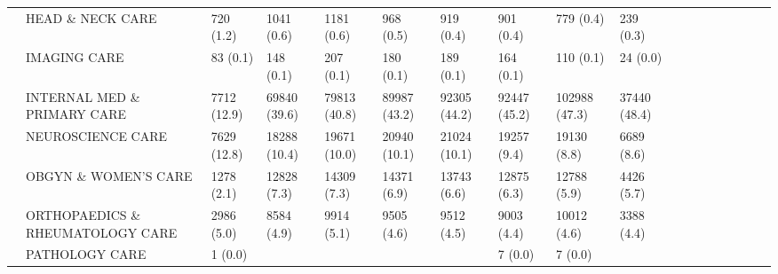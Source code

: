\begin{tabular}{llllllllllllllllll}
                                       & HEAD \& NECK CARE &                    720 (1.2) &      1041 (0.6) &      1181 (0.6) &       968 (0.5) &       919 (0.4) &       901 (0.4) &       779 (0.4) &      239 (0.3) &                   &                    &                    &                    &                    &                     &                     &                     \\
                                       & IMAGING CARE &                     83 (0.1) &       148 (0.1) &       207 (0.1) &       180 (0.1) &       189 (0.1) &       164 (0.1) &       110 (0.1) &       24 (0.0) &                   &                    &                    &                    &                    &                     &                     &                     \\
                                       & INTERNAL MED \& PRIMARY CARE &                  7712 (12.9) &    69840 (39.6) &    79813 (40.8) &    89987 (43.2) &    92305 (44.2) &    92447 (45.2) &   102988 (47.3) &   37440 (48.4) &                   &                    &                    &                    &                    &                     &                     &                     \\
                                       & NEUROSCIENCE CARE &                  7629 (12.8) &    18288 (10.4) &    19671 (10.0) &    20940 (10.1) &    21024 (10.1) &     19257 (9.4) &     19130 (8.8) &     6689 (8.6) &                   &                    &                    &                    &                    &                     &                     &                     \\
                                       & OBGYN \& WOMEN'S CARE &                   1278 (2.1) &     12828 (7.3) &     14309 (7.3) &     14371 (6.9) &     13743 (6.6) &     12875 (6.3) &     12788 (5.9) &     4426 (5.7) &                   &                    &                    &                    &                    &                     &                     &                     \\
                                       & ORTHOPAEDICS \& RHEUMATOLOGY CARE &                   2986 (5.0) &      8584 (4.9) &      9914 (5.1) &      9505 (4.6) &      9512 (4.5) &      9003 (4.4) &     10012 (4.6) &     3388 (4.4) &                   &                    &                    &                    &                    &                     &                     &                     \\
                                       & PATHOLOGY CARE &                      1 (0.0) &                 &                 &                 &                 &         7 (0.0) &         7 (0.0) &                &                   &                    &                    &                    &                    &                     &                     &                     \\

\end{tabular}
